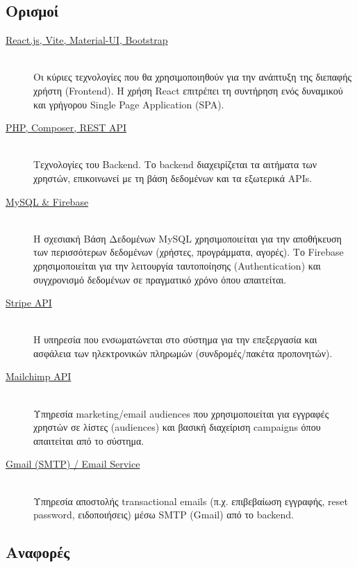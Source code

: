 \documentclass[12pt,a4paper]{report}
\begin{document}
\subsection{Ορισμοί}
\begin{description}
    \item[\underline{React.js, Vite, Material-UI, Bootstrap}] \hfill \\
    Οι κύριες τεχνολογίες που θα χρησιμοποιηθούν για την ανάπτυξη της διεπαφής χρήστη (Frontend). Η χρήση React επιτρέπει τη συντήρηση ενός δυναμικού και γρήγορου Single Page Application (SPA).
    
    \item[\underline{PHP, Composer, REST API}] \hfill \\
    Τεχνολογίες του Backend. Το backend διαχειρίζεται τα αιτήματα των χρηστών, επικοινωνεί με τη βάση δεδομένων και τα εξωτερικά APIs.
    
    \item[\underline{MySQL \& Firebase}] \hfill \\
    Η σχεσιακή Βάση Δεδομένων MySQL χρησιμοποιείται για την αποθήκευση των περισσότερων δεδομένων (χρήστες, προγράμματα, αγορές). Το Firebase χρησιμοποιείται για την λειτουργία ταυτοποίησης (Authentication) και συγχρονισμό δεδομένων σε πραγματικό χρόνο όπου απαιτείται.
    
    \item[\underline{Stripe API}] \hfill \\
    Η υπηρεσία που ενσωματώνεται στο σύστημα για την επεξεργασία και ασφάλεια των ηλεκτρονικών πληρωμών (συνδρομές/πακέτα προπονητών).

    \item[\underline{Mailchimp API}] \hfill \\
    Υπηρεσία marketing/email audiences που χρησιμοποιείται για εγγραφές χρηστών σε λίστες (audiences) και βασική διαχείριση campaigns όπου απαιτείται από το σύστημα.

    \item[\underline{Gmail (SMTP) / Email Service}] \hfill \\
    Υπηρεσία αποστολής transactional emails (π.χ. επιβεβαίωση εγγραφής, reset password, ειδοποιήσεις) μέσω SMTP (Gmail) από το backend.
\end{description}

\subsection{Αναφορές}
\end{document}
